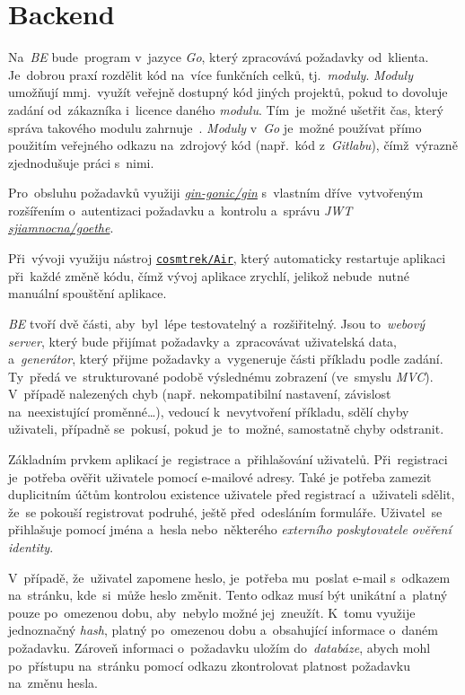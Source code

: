 \documentclass[11pt,a4paper]{report}
\let\oldacrshort\acrshort
\renewcommand{\acrshort}[1]{\emph{\normalsize\color[rgb]{0,0,0}\noindent\oldacrshort{#1}}}
\begin{document}
        \section{Backend}
            Na~\acrshort{BE} bude~program v~jazyce \emph{Go}, který zpracovává požadavky od~klienta. Je~dobrou praxí rozdělit kód na~více funkčních celků, tj.~\emph{moduly}. \emph{Moduly} umožňují mmj.~využít veřejně dostupný kód jiných projektů, pokud to dovoluje zadání od~zákazníka i~licence daného \emph{modulu}. Tím~je~možné ušetřit čas, který správa takového modulu zahrnuje~\cite{Zimmerman2023:howtowritebetter}. \emph{Moduly} v~\emph{Go} je~možné používat přímo použitím veřejného odkazu na~zdrojový kód (např.~kód z~\emph{Gitlabu}), čímž~výrazně zjednodušuje práci s~nimi.
            
            Pro~obsluhu požadavků využiji \href{https://github.com/gin-gonic/gin}{\emph{gin-gonic/gin}} s~vlastním dříve~vytvořeným rozšířením o~autentizaci požadavku a~kontrolu a~správu \acrshort{JWT} \href{https://gitlab.com/sjiamnocna/goethe}{\emph{sjiamnocna/goethe}}.

            Při~vývoji využiju nástroj \href{https://github.com/cosmtrek/air}{\texttt{cosmtrek/Air}}, který automaticky restartuje aplikaci při~každé změně kódu, čímž vývoj aplikace zrychlí, jelikož nebude~nutné manuální spouštění aplikace.

            \acrshort{BE} tvoří dvě části, aby~byl~lépe testovatelný a~rozšiřitelný. Jsou to~\emph{webový server}, který bude přijímat požadavky a~zpracovávat uživatelská data, a~\emph{generátor}, který přijme požadavky a~vygeneruje části příkladu podle zadání. Ty~předá ve~strukturované podobě výslednému zobrazení (ve~smyslu \emph{MVC}). V~případě nalezených chyb (např. nekompatibilní nastavení, závislost na~neexistující proměnné\dots), vedoucí k~nevytvoření příkladu, sdělí chyby uživateli, případně se~pokusí, pokud je~to~možné, samostatně chyby odstranit.

            Základním prvkem aplikací je~registrace a~přihlašování uživatelů. Při~registraci je~potřeba ověřit uživatele pomocí e-mailové adresy. Také je potřeba zamezit duplicitním účtům kontrolou existence uživatele před registrací a~uživateli sdělit, že~se pokouší registrovat podruhé, ještě před~odesláním formuláře. Uživatel~se přihlašuje pomocí jména a~hesla nebo~některého \emph{externího poskytovatele ověření identity}.
            
            V~případě, že~uživatel zapomene heslo, je~potřeba mu~poslat e-mail s~odkazem na~stránku, kde~si~může heslo změnit. Tento odkaz musí být unikátní a~platný pouze po~omezenou dobu, aby~nebylo možné jej~zneužít. K~tomu využije jednoznačný \emph{hash}, platný po~omezenou dobu a~obsahující informace o~daném požadavku. Zároveň informaci o~požadavku uložím do~\emph{databáze}, abych mohl po~přístupu na~stránku pomocí odkazu zkontrolovat platnost požadavku na~změnu hesla.
\end{document}
